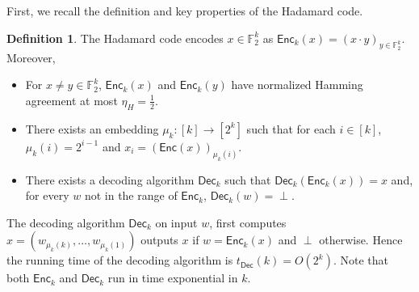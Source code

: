 \documentclass[11pt]{article}
\theoremstyle{plain}
\theoremstyle{definition}
\newtheorem{definition}[theorem]{Definition}
\newcommand{\1}{\mathbb{1}} %
\newcommand{\bF}{\mathbb{F}}
\newcommand{\Enc}{\mathsf{Enc}}
\newcommand{\Dec}{\mathsf{Dec}}
\begin{document}
First, we recall the definition and key properties of the Hadamard code.
\begin{definition}
    The Hadamard code encodes $x \in \bF_2^k$ as $\Enc_k(x) = (x\cdot y)_{y \in \bF_2^k}$. Moreover,
    \begin{itemize}
        \item For $x \neq y \in \bF_2^k$, $\Enc_k(x)$ and $\Enc_k(y)$ have normalized Hamming agreement at most $\eta_H = \frac{1}{2}$.
        \item There exists an embedding $\mu_k: [k] \to [2^k]$ such that for each $i \in [k]$, $\mu_k(i) = 2^{i-1}$ and $x_i = (\Enc(x))_{\mu_k(i)}$.
        \item There exists a decoding algorithm $\Dec_k$ such that $\Dec_k(\Enc_k(x)) = x$ and, for every $w$ not in the range of $\Enc_k$, $\Dec_k(w) = \perp$.
    \end{itemize}
\end{definition}
The decoding algorithm $\Dec_k$ on input $w$, first computes $x = (w_{\mu_k(k)},\ldots,w_{\mu_k(1)})$
outputs $x$ if $w = \Enc_k(x)$ and $\perp$ otherwise.
Hence the running time of the decoding algorithm is $t_{\Dec}(k) = O(2^k).$
Note that both $\Enc_k$ and $\Dec_k$ run in time exponential in $k$.
\end{document}
